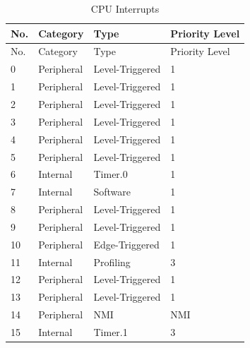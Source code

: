 \begin{longtable}[c]{ |p{1.5cm}|p{4.5cm}|p{4.5cm}|p{4.5cm}| }

    \caption{CPU Interrupts}
    \label{table:CPUInterrupt} \\
    \hline
    \rowcolor{lightgray}
    No. & Category      & Type              & Priority Level    \\
    \hline
    \endfirsthead
    
    \hline
    \rowcolor{lightgray}
    No. & Category      & Type              & Priority Level    \\
    \hline
    \endhead
    
    \endfoot
    
    \hline
    \endlastfoot
    
    0   & Peripheral    & Level-Triggered   & 1                 \\
    \hline
    1   & Peripheral    & Level-Triggered   & 1                 \\
    \hline
    2   & Peripheral    & Level-Triggered   & 1                 \\
    \hline
    3   & Peripheral    & Level-Triggered   & 1                 \\
    \hline
    4   & Peripheral    & Level-Triggered   & 1                 \\
    \hline
    5   & Peripheral    & Level-Triggered   & 1                 \\
    \hline
    6   & Internal      & Timer.0           & 1                 \\
    \hline
    7   & Internal      & Software          & 1                 \\
    \hline
    8   & Peripheral    & Level-Triggered   & 1                 \\
    \hline
    9   & Peripheral    & Level-Triggered   & 1                 \\
    \hline
    10  & Peripheral    & Edge-Triggered    & 1                 \\
    \hline
    11  & Internal      & Profiling         & 3                 \\
    \hline
    12  & Peripheral    & Level-Triggered   & 1                 \\
    \hline
    13  & Peripheral    & Level-Triggered   & 1                 \\
    \hline
    14  & Peripheral    & NMI               & NMI               \\
    \hline
    15  & Internal      & Timer.1           & 3                 \\

\end{longtable}
